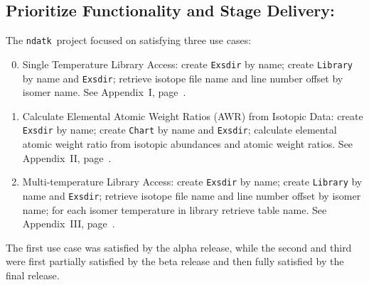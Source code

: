 \documentclass[12pt]{lamemo}
\newcommand{\ndatk}{\texttt{ndatk}}
\begin{document}
\subsection{\hspace{-1.5em}Prioritize Functionality and Stage Delivery:}
The \ndatk\ project focused on satisfying three use cases:
\begin{enumerate}\setcounter{enumi}{-1}
\item Single Temperature Library Access: create \texttt{Exsdir} by
  name; create \texttt{Library} by name and \texttt{Exsdir}; retrieve
  isotope file name and line number offset by isomer name.  See
  Appendix~I, page~\pageref{app:use0}. 
\item Calculate Elemental Atomic Weight Ratios (AWR) from Isotopic
  Data: create \texttt{Exsdir} by name; create \texttt{Chart} by name
  and \texttt{Exsdir}; calculate elemental atomic weight ratio from
  isotopic abundances and atomic weight ratios.  See Appendix~II,
  page~\pageref{app:use1}.
\item Multi-temperature Library Access: create \texttt{Exsdir} by
  name; create \texttt{Library} by name and \texttt{Exsdir}; retrieve
  isotope file name and line number offset by isomer name; for each
  isomer temperature in library retrieve table name.  See
  Appendix~III, page~\pageref{app:use2}.
\end{enumerate}
The first use case was satisfied by the alpha release, while the
second and third were first partially satisfied by the beta release
and then fully satisfied by the final release.
\end{document}
